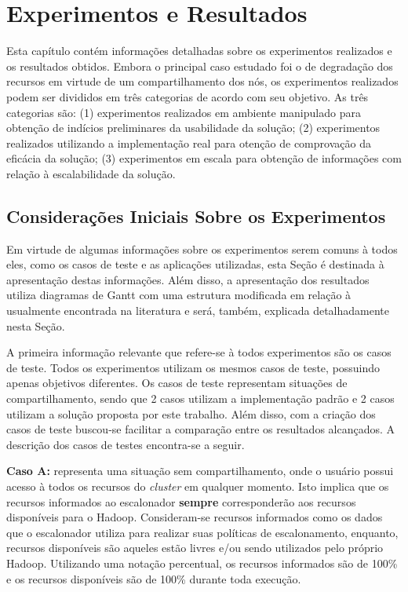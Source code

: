 \chapter{Experimentos e Resultados}
\label{chap:ExpRes}
Esta capítulo contém informações detalhadas sobre os experimentos realizados e os resultados obtidos. Embora o principal caso estudado foi o de degradação dos recursos em virtude de um compartilhamento dos nós, os experimentos realizados podem ser divididos em três categorias de acordo com seu objetivo. As três categorias são: (1) experimentos realizados em ambiente manipulado para obtenção de indícios preliminares da usabilidade da solução; (2) experimentos realizados utilizando a implementação real para otenção de comprovação da eficácia da solução; (3) experimentos em escala para obtenção de informações com relação à escalabilidade da solução.

\section{Considerações Iniciais Sobre os Experimentos}
\label{sec:casosteste}
Em virtude de algumas informações sobre os experimentos serem comuns à todos eles, como os casos de teste e as aplicações utilizadas, esta Seção é destinada à apresentação destas informações. Além disso, a apresentação dos resultados utiliza diagramas de Gantt com uma estrutura modificada em relação à usualmente encontrada na literatura e será, também, explicada detalhadamente nesta Seção.

A primeira informação relevante que refere-se à todos experimentos são os casos de teste. Todos os experimentos utilizam os mesmos casos de teste, possuindo apenas objetivos diferentes. Os casos de teste representam situações de compartilhamento, sendo que 2 casos utilizam a implementação padrão e 2 casos utilizam a solução proposta por este trabalho. Além disso, com a criação dos casos de teste buscou-se facilitar a comparação entre os resultados alcançados. A descrição dos casos de testes encontra-se a seguir.

\textbf{Caso A:} representa uma situação sem compartilhamento, onde o usuário possui acesso à todos os recursos do \textit{cluster} em qualquer momento. Isto implica que os recursos informados ao escalonador \textbf{sempre} corresponderão aos recursos disponíveis para o Hadoop. Consideram-se recursos informados como os dados que o escalonador utiliza para realizar suas políticas de escalonamento, enquanto, recursos disponíveis são aqueles estão livres e/ou sendo utilizados pelo próprio Hadoop. Utilizando uma notação percentual, os recursos informados são de 100\% e os recursos disponíveis são de 100\% durante toda execução.

